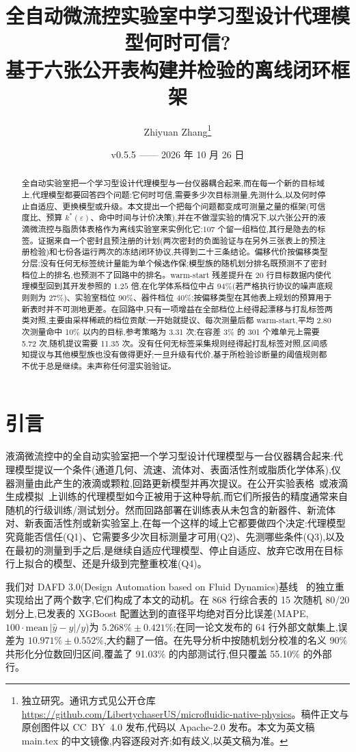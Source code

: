 \documentclass[11pt,a4paper]{ctexart}
\title{全自动微流控实验室中学习型设计代理模型何时可信?\\基于六张公开表构建并检验的离线闭环框架}
\author{Zhiyuan Zhang\thanks{独立研究。通讯方式见公开仓库 \url{https://github.com/LibertychaserUS/microfluidic-native-physics}。稿件正文与原创图件以 CC~BY~4.0 发布,代码以 Apache-2.0 发布。本文为英文稿 main.tex 的中文镜像,内容逐段对齐;如有歧义,以英文稿为准。}}
\date{v0.5.5 —— 2026 年 10 月 26 日}
\begin{document}
\maketitle

\begin{abstract}
全自动实验室把一个学习型设计代理模型与一台仪器耦合起来,而在每一个新的目标域上,代理模型都要回答四个问题:它何时可信,需要多少次目标测量,先测什么,以及何时停止自适应、更换模型或升级。本文提出一个把每个问题都变成可测量之量的框架(可信度比、预算 $k^{*}(\varepsilon)$、命中时间与计价决策),并在不做湿实验的情况下,以六张公开的液滴微流控与脂质体表格作为离线实验室来实例化它:107 个留一组档位,其行是隐去的标签。证据来自一个密封且预注册的计划(两次密封的负面验证与在另外三张表上的预注册检验)和七份各运行两次的冻结闭环协议,共得到二十三条结论。偏移代价按偏移类型分层;没有任何无标签统计量能为单个候选作保;模型族的随机划分排名既预测不了密封档位上的排名,也预测不了回路中的排名。warm-start 残差提升在 20 行目标数据内使代理模型回到其开发参照的 $1.25$ 倍,在化学体系档位中占 94\%(若严格执行协议的噪声底规则则为 27\%)、实验室档位 90\%、器件档位 40\%;按偏移类型在其他表上规划的预算用于新表时并不可测地更差。在回路中,只有一项增益在全部档位上经得起漂移与打乱标签两类对照,主要由采样稀疏的档位贡献:一开始就提议、每次测量后都 warm-start,平均 2.80 次测量命中 10\% 以内的目标,参考策略为 3.31 次;在容差 3\% 的 301 个难单元上需要 5.72 次,随机提议需要 11.35 次。没有任何无标签采集规则经得起打乱标签对照,区间感知提议与其他模型族也没有做得更好;一旦升级有代价,基于所检验诊断量的阈值规则都不优于总是继续。未声称任何湿实验验证。
\end{abstract}

\section{引言}
\label{sec:intro}
液滴微流控中的全自动实验室把一个学习型设计代理模型与一台仪器耦合起来:代理模型提议一个条件(通道几何、流速、流体对、表面活性剂或脂质化学体系),仪器测量由此产生的液滴或颗粒,回路更新模型并再次提议。在公开实验表格~\cite{lashkaripour2021,lashkaripour2024}或液滴生成模拟~\cite{samari2025}上训练的代理模型如今正被用于这种导航,而它们所报告的精度通常来自随机的行级训练/测试划分。然而回路部署在训练表从未包含的新器件、新流体对、新表面活性剂或新实验室上,在每一个这样的域上它都要做四个决定:代理模型究竟能否信任(Q1)、它需要多少次目标测量才可用(Q2)、先测哪些条件(Q3),以及在最初的测量到手之后,是继续自适应代理模型、停止自适应、放弃它改用在目标行上拟合的模型、还是升级到完整重校准(Q4)。

我们对 DAFD 3.0(Design Automation based on Fluid Dynamics)基线~\cite{lashkaripour2024} 的独立重实现给出了两个数字,它们构成了本文的动机。在 868 行综合表的 15 次随机 80/20 划分上,已发表的 XGBoost 配置达到的直径平均绝对百分比误差(MAPE,$100 \cdot \mathrm{mean}\,|\hat y - y|/y$)为 $5.268\% \pm 0.421\%$;在同一论文发布的 64 行外部文献集上,误差为 $10.971\% \pm 0.552\%$,大约翻了一倍。在先导分析中按随机划分校准的名义 90\% 共形化分位数回归区间,覆盖了 91.03\% 的内部测试行,但只覆盖 55.10\% 的外部行。
\end{document}
